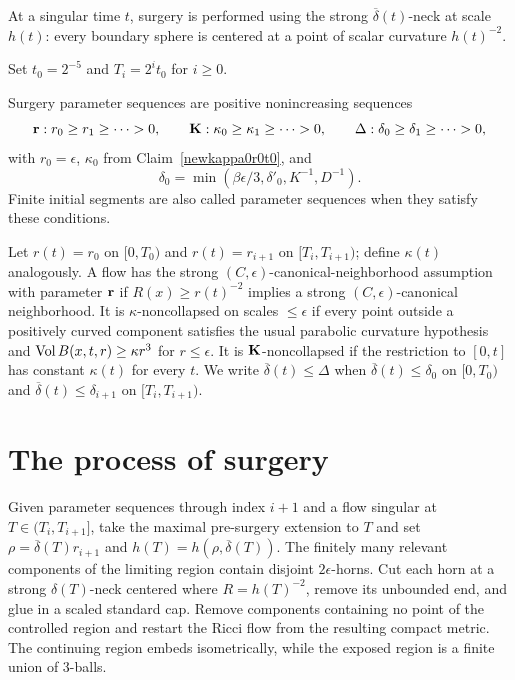 At a singular time $t$, surgery is performed using the strong
$\overline\delta(t)$-neck at scale $h(t)$: every boundary sphere is centered at a
point of scalar curvature $h(t)^{-2}$.

\begin{definition}[Time steps $T_i=2^it_0$]
\label{def:time-steps-T-i}
Set $t_0=2^{-5}$ and $T_i=2^it_0$ for $i\geq0$.
\end{definition}

\begin{definition}
\label{def:surgery-parameter-sequences}

\label{surgeryparams}
Surgery parameter sequences are positive nonincreasing sequences
\[
  {\bf r}:r_0\geq r_1\geq\cdots>0,
  \qquad
  {\bf K}:\kappa_0\geq\kappa_1\geq\cdots>0,
  \qquad
  \Delta:\delta_0\geq\delta_1\geq\cdots>0,
\]
with $r_0=\epsilon$, $\kappa_0$ from Claim~\ref{newkappa0r0t0}, and
\[
  \delta_0=\min(\beta\epsilon/3,\delta'_0,K^{-1},D^{-1}).
\]
Finite initial segments are also called parameter sequences when they satisfy
these conditions.
\end{definition}

Let $r(t)=r_0$ on $[0,T_0)$ and $r(t)=r_{i+1}$ on
$[T_i,T_{i+1})$; define $\kappa(t)$ analogously. A flow has the strong
$(C,\epsilon)$-canonical-neighborhood assumption with parameter ${\bf r}$ if
$R(x)\geq r(t)^{-2}$ implies a strong $(C,\epsilon)$-canonical neighborhood.
It is $\kappa$-noncollapsed on scales $\leq\epsilon$ if every point outside a
positively curved component satisfies the usual parabolic curvature hypothesis
and $\operatorname{Vol} B(x,t,r)\geq\kappa r^3$ for $r\leq\epsilon$. It is ${\bf K}$-noncollapsed
if the restriction to $[0,t]$ has constant $\kappa(t)$ for every $t$. We write
$\overline\delta(t)\leq\Delta$ when
$\overline\delta(t)\leq\delta_0$ on $[0,T_0)$ and
$\overline\delta(t)\leq\delta_{i+1}$ on $[T_i,T_{i+1})$.

\section{The process of surgery}
\label{sect:process}

Given parameter sequences through index $i+1$ and a flow singular at
$T\in(T_i,T_{i+1}]$, take the maximal pre-surgery extension to $T$ and set
$\rho=\overline\delta(T)r_{i+1}$ and
$h(T)=h(\rho,\overline\delta(T))$. The finitely many relevant components of
the limiting region contain disjoint $2\epsilon$-horns. Cut each horn at a
strong $\delta(T)$-neck centered where $R=h(T)^{-2}$, remove its unbounded end,
and glue in a scaled standard cap. Remove components containing no point of
the controlled region and restart the Ricci flow from the resulting compact
metric. The continuing region embeds isometrically, while the exposed region is
a finite union of $3$-balls.

